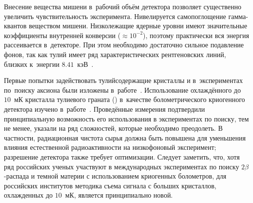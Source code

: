 \documentclass[a4paper,article,14pt]{extarticle}
\begin{document}
Внесение вещества мишени в~рабочий объём детектора позволяет существенно увеличить чувствительность эксперимента.
Нивелируется самопоглощение гамма-квантов веществом мишени.
Низколежащие ядерные уровни имеют значительные коэффициенты внутренней конверсии ($\approx 10^{-2}$), поэтому практически вся энергия рассеивается в~детекторе.
При этом необходимо достаточно сильное подавление фонов, так как тулий имеет ряд характеристических рентгеновских линий, близких к~энергии $8.41$~кэВ~\cite{Derbin2009}.

Первые попытки задействовать тулийсодержащие кристаллы {\NaTmWO} и {\NaTmMoO} в~экспериментах по~поиску аксиона были изложены в~работе~\cite{tm_first}.
Использование охлаждённого до $10$~мК кристалла тулиевого граната ({\TmAlO}) в~качестве болометрического криогенного детектора изучено в~работе~\cite{test_bolometric_tm}.
Проведённые измерения подтвердили принципиальную возможность его использования в экспериментах по поиску, тем не менее, указали на ряд сложностей, которые необходимо преодолеть.
В частности, радиационная чистота сырья должна быть повышена для уменьшения влияния естественной радиоактивности на низкофоновый эксперимент; разрешение детектора также требует оптимизации.
Следует заметить, что, хотя ряд российских ученых участвуют в международных экспериментах по поиску $2\beta$-распада и темной материи с использованием криогенных болометров, для российских институтов методика съема сигнала с больших кристаллов, охлажденных до $10$~мК, является принципиально новой.
\end{document}
